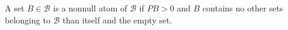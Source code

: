 A set $B \in \mathcal{B}$ is a nonnull atom of $\mathcal{B}$ if $PB > 0$ and $B$ contains no other sets belonging to $\mathcal{B}$ than itself and the empty set.
